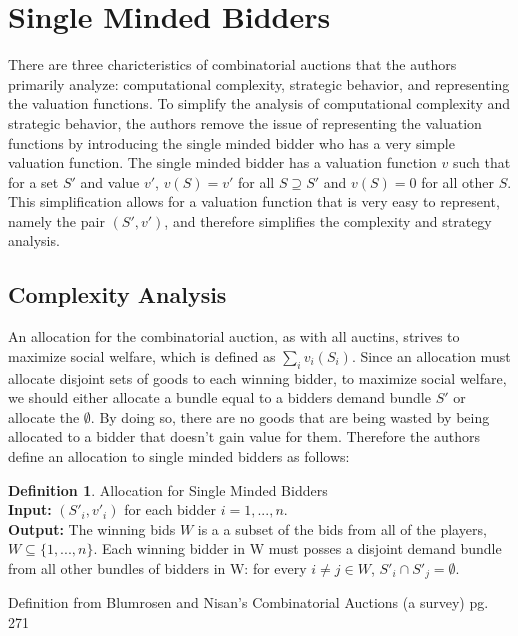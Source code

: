 \documentclass[10pt,onecolumn,letterpaper]{article}
\theoremstyle{definition}
\newtheorem{definition}{Definition}[section]
\begin{document}
\section{Single Minded Bidders} %

There are three charicteristics of combinatorial auctions that the authors primarily analyze: computational complexity, strategic behavior, and representing the valuation functions. To simplify the analysis of computational complexity and strategic behavior, the authors remove the issue of representing the valuation functions by introducing the single minded bidder who has a very simple valuation function. The single minded bidder has a valuation function $v$ such that for a set $S'$ and value $v'$, $v(S) = v'$ for all $S \supseteq S'$ and $v(S) = 0$ for all other $S$. This simplification allows for a valuation function that is very easy to represent, namely the pair $(S', v')$, and therefore simplifies the complexity and strategy analysis.

\subsection{Complexity Analysis} %
An allocation for the combinatorial auction, as with all auctins, strives to maximize social welfare, which is defined as $\sum_i v_i(S_i)$. Since an allocation must allocate disjoint sets of goods to each winning bidder, to maximize social welfare, we should either allocate a bundle equal to a bidders demand bundle $S'$ or allocate the $\emptyset$. By doing so, there are no goods that are being wasted by being allocated to a bidder that doesn't gain value for them. Therefore the authors define an allocation to single minded bidders as follows:

\theoremstyle{definition}
\begin{definition}{Allocation for Single Minded Bidders}
\\
\textbf{Input:} $(S'_i,v'_i)$ for each bidder $i = 1,...,n$.
\\
\textbf{Output:} The winning bids $W$ is a a subset of the bids from all of the players, $W \subseteq \{1,...,n\}$. Each winning bidder in W must posses a disjoint demand bundle from all other bundles of bidders in W: for every $i \neq j \in W$, $S'_i \cap S'_j = \emptyset$.

Definition from Blumrosen and Nisan's Combinatorial Auctions (a survey) pg. 271 \cite{paper}

\end{definition}
\end{document}
